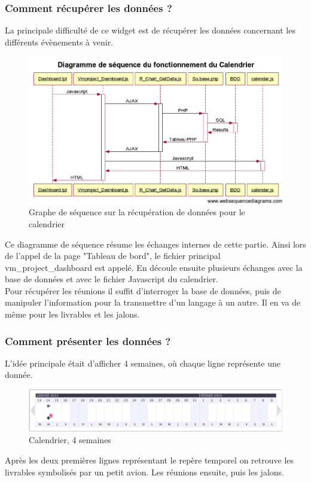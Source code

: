 \documentclass[12pt]{report}
\begin{document}
\subsubsection{Comment récupérer les données ?}
La principale difficulté de ce widget est de récupérer les données concernant les différents évènements à venir.\\
	
\begin{figure}[H]
	\centering
	\includegraphics[width=1\textwidth]{pictures/matthieu/m_sequence.png}
	\caption{Graphe de séquence sur la récupération de données pour le calendrier}
	\label{m1}
\end{figure}
	
	Ce diagramme de séquence résume les échanges internes de cette partie. Ainsi lors de l’appel de la page "Tableau de bord", le fichier principal vm\_project\_dashboard est appelé. En découle ensuite plusieurs échanges avec la base de données et avec le fichier Javascript du calendrier.\\
	
Pour récupérer les réunions il suffit d’interroger la base de données, puis de manipuler l’information pour la transmettre d’un langage à un autre. Il en va de même pour les livrables et les jalons.\\
\subsubsection{Comment présenter les données ?}
L’idée principale était d’afficher 4 semaines, où chaque ligne représente une donnée.\\
\begin{figure}[H]
	\centering
	\includegraphics[width=1\textwidth]{pictures/matthieu/m_calendar_1.png}
	\caption{Calendrier, 4 semaines}
	\label{m2}
\end{figure}
	Après les deux premières lignes représentant le repère temporel on retrouve les livrables symbolisés par un petit avion. Les réunions ensuite, puis les jalons.\\
\end{document}
